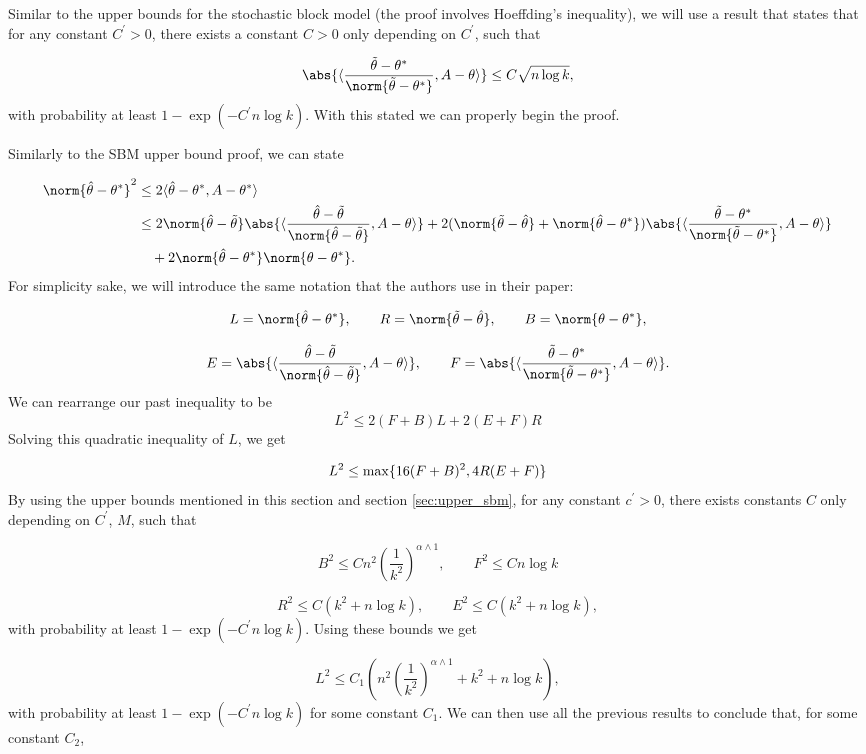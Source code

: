 \documentclass[11pt]{article}
\begin{document}
Similar to the upper bounds for the stochastic block model (the proof involves Hoeffding's inequality), we will use a result that states that for any constant $C^\prime > 0$, there exists a constant $C>0$ only depending on $C^\prime$, such that

\[  \abs{\dprod{\frac{\ttheta - \atheta}{\norm{\ttheta-\atheta}}, A-\theta}} \leq C\sqrt{n\log k},
\]
with probability at least $1-\exp(-C^\prime n \log k)$. With this stated we can properly begin the proof.

Similarly to the SBM upper bound proof, we can state

\begin{align*}
    \norm{\htheta - \atheta}^2 & \leq 2\dprod{\htheta - \atheta, A - \atheta} \\
    & \leq 2\norm{\htheta - \ttheta}\abs{\dprod{\frac{\htheta-\ttheta}{\norm{\htheta-\ttheta}},A-\theta}} + 2(\norm{\ttheta-\htheta} + \norm{\htheta-\atheta})\abs{\dprod{\frac{\ttheta-\atheta}{\norm{\ttheta-\atheta}},A-\theta}} \\
    & \quad + 2\norm{\htheta-\atheta}\norm{\theta-\atheta}.
\end{align*}
For simplicity sake, we will introduce the same notation that the authors use in their paper:

\[ L = \norm{\htheta-\atheta}, \qquad R = \norm{\ttheta-\htheta}, \qquad B = \norm{\theta - \atheta},  \]

\[ E = \abs{\dprod{\frac{\htheta-\ttheta}{\norm{\htheta-\ttheta}},A-\theta}}, \qquad F = \abs{\dprod{\frac{\ttheta-\atheta}{\norm{\ttheta-\atheta}},A-\theta}}.  \]
We can rearrange our past inequality to be
\[
L^2 \leq 2(F+B)L + 2(E+F)R
\]
Solving this quadratic inequality of $L$, we get

\[
L^2 \leq \max\{16(F+B)^2, 4R(E+F)\}
\]
By using the upper bounds mentioned in this section and section \ref{sec:upper_sbm}, for any constant $c^\prime >0$, there exists constants $C$ only depending on $C^\prime$, $M$, such that

\[ B^2 \leq Cn^2 \left(\frac{1}{k^2}\right)^{\alpha \wedge 1}, \qquad F^2 \leq Cn\log k   \]

\[ R^2 \leq C(k^2 + n\log k), \qquad E^2 \leq C(k^2 + n\log k),   \]
with probability at least $1-\exp(-C^\prime n \log k)$. Using these bounds we get

\[ L^2 \leq C_1 \left( n^2 \left( \frac{1}{k^2} \right)^{\alpha \wedge 1} + k^2 + n\log k  \right),
\]
with probability at least $1-\exp(-C^\prime n \log k)$ for some constant $C_1$. We can then use all the previous results to conclude that, for some constant $C_2$,
\end{document}
